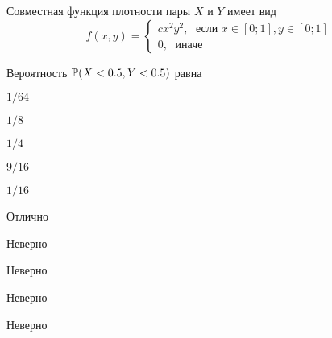 
\begin{question}
Совместная функция плотности пары \(X\) и \(Y\) имеет вид \[
f(x,y)=\begin{cases}
cx^2y^2, \; \text{ если } x\in[0;1], y\in [0;1] \\
0, \; \text{ иначе}
\end{cases}
\]

\vspace{0.5cm}

Вероятность \(\P(X<0.5, Y<0.5)\) равна
\begin{answerlist}
  \item \(1/64\)
  \item \(1/8\)
  \item \(1/4\)
  \item \(9/16\)
  \item \(1/16\)
\end{answerlist}
\end{question}

\begin{solution}
\begin{answerlist}
  \item Отлично
  \item Неверно
  \item Неверно
  \item Неверно
  \item Неверно
\end{answerlist}
\end{solution}

